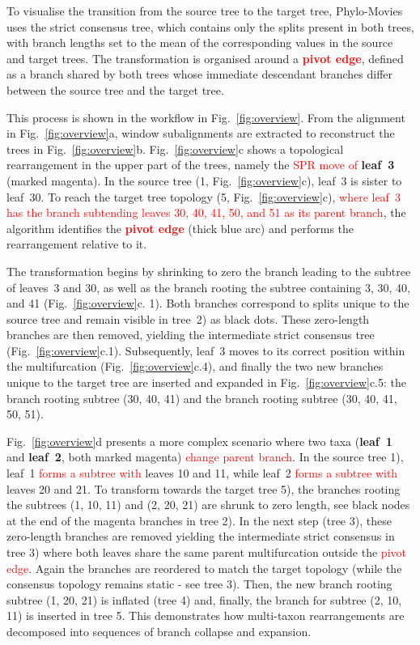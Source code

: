 To visualise the transition from the source tree to the target tree, Phylo-Movies uses the strict consensus tree, which contains only the splits present in both trees, with branch lengths set to the mean of the corresponding values in the source and target trees. The transformation is organised around a \textbf{\textcolor{red}{pivot edge}}, defined as a branch shared by both trees whose immediate descendant branches differ between the source tree and the target tree.

This process is shown in the workflow in Fig.~\ref{fig:overview}. From the alignment in Fig.~\ref{fig:overview}a, window subalignments are extracted to reconstruct the trees in Fig.~\ref{fig:overview}b. Fig.~\ref{fig:overview}c shows a topological rearrangement in the upper part of the trees, namely the \textcolor{red}{SPR move of} \textbf{leaf~3} (marked magenta). In the source tree (1, Fig.~\ref{fig:overview}c), leaf~3 is sister to leaf~30. To reach the target tree topology (5, Fig.~\ref{fig:overview}c), \textcolor{red}{where leaf~3 has the branch subtending leaves 30, 40, 41, 50, and 51 as its parent branch}, the algorithm identifies the \textbf{\textcolor{red}{pivot edge}} (thick blue arc) and performs the rearrangement relative to it.

The transformation begins by shrinking to zero the branch leading to the subtree of leaves~3 and 30, as well as the branch rooting the subtree containing 3, 30, 40, and 41 (Fig.~\ref{fig:overview}c. 1). Both branches correspond to splits unique to the source tree and remain visible in tree~2) as black dots. These zero-length branches are then removed, yielding the intermediate strict consensus tree (Fig.~\ref{fig:overview}c.1). Subsequently, leaf~3 moves to its correct position within the multifurcation (Fig.~\ref{fig:overview}c.4), and finally the two new branches unique to the target tree are inserted and expanded in Fig.~\ref{fig:overview}c.5: the branch rooting subtree (30, 40, 41) and the branch rooting subtree (30, 40, 41, 50, 51).

Fig.~\ref{fig:overview}d presents a more complex scenario where two taxa (\textbf{leaf~1} and \textbf{leaf~2}, both marked magenta) \textcolor{red}{change parent branch}. In the source tree 1), leaf~1 \textcolor{red}{forms a subtree with} leaves 10 and 11, while leaf~2 \textcolor{red}{forms a subtree with} leaves 20 and 21. To transform towards the target tree 5), the branches rooting the subtrees (1, 10, 11) and (2, 20, 21) are shrunk to zero length, see black nodes at the end of the magenta branches in tree 2). In the next step (tree 3), these zero-length branches are removed yielding the intermediate strict consensus in tree 3) where both leaves share the same parent multifurcation outside the \textcolor{red}{pivot edge}. Again the branches are reordered to match the target topology (while the consensus topology remains static - see tree 3). Then, the new branch rooting subtree (1, 20, 21) is inflated (tree 4) and, finally, the branch for subtree (2, 10, 11) is inserted in tree 5. This demonstrates how multi-taxon rearrangements are decomposed into sequences of branch collapse and expansion.

